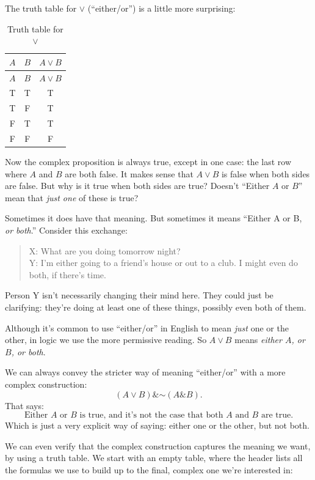 \documentclass[justified]{tufte-book}
\renewcommand{\neg}{\mathbin{\sim}}
\renewcommand{\wedge}{\mathbin{\&}}
\theoremstyle{definition}
\theoremstyle{definition}
\theoremstyle{definition}
\theoremstyle{definition}
\theoremstyle{remark}
\begin{document}
The truth table for \(\vee\) (``either/or'') is a little more surprising:

\begin{longtable}[]{@{}ccc@{}}
\caption{\label{tab:unnamed-chunk-25}Truth table for \(\vee\)}\tabularnewline
\toprule
\(A\) & \(B\) & \(A \vee B\) \\
\midrule
\endfirsthead
\toprule
\(A\) & \(B\) & \(A \vee B\) \\
\midrule
\endhead
T & T & T \\
T & F & T \\
F & T & T \\
F & F & F \\
\bottomrule
\end{longtable}

Now the complex proposition is always true, except in one case: the last row where \(A\) and \(B\) are both false. It makes sense that \(A \vee B\) is false when both sides are false. But why is it true when both sides are true? Doesn't ``Either \(A\) or \(B\)'' mean that \emph{just one} of these is true?

Sometimes it does have that meaning. But sometimes it means ``Either A or B, \emph{or both}.'' Consider this exchange:

\begin{quote}
X: What are you doing tomorrow night?\\
Y: I'm either going to a friend's house or out to a club. I might even do both, if there's time.
\end{quote}

Person Y isn't necessarily changing their mind here. They could just be clarifying: they're doing at least one of these things, possibly even both of them.

Although it's common to use ``either/or'' in English to mean \emph{just} one or the other, in logic we use the more permissive reading. So \(A \vee B\) means \emph{either \(A\), or \(B\), or both}.

We can always convey the stricter way of meaning ``either/or'' with a more complex construction:
\[(A \vee B) \wedge \neg (A \wedge B).\]
That says:
\[ \mbox{Either $A$ or $B$ is true, and it's not the case that both $A$ and $B$ are true}.\]
Which is just a very explicit way of saying: either one or the other, but not both.

We can even verify that the complex construction captures the meaning we want, by using a truth table. We start with an empty table, where the header lists all the formulas we use to build up to the final, complex one we're interested in:
\end{document}
